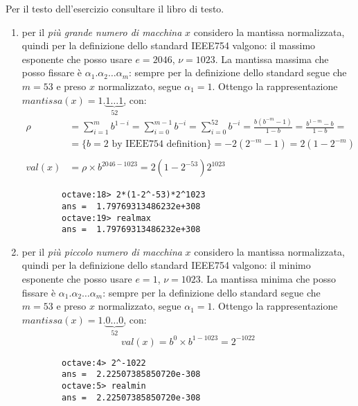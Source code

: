 \begin{exercise}[1.10]
Per il testo dell'esercizio consultare il libro di testo.
\end{exercise}
\begin{enumerate}
	\item per il \emph{pi\`u grande numero di macchina} $x$ considero la mantissa normalizzata,
	quindi per la definizione dello standard IEEE754 valgono: il massimo esponente che posso
	usare $e = 2046$, $\nu = 1023$.
	La mantissa massima che posso fissare \`e $\alpha_{1}.\alpha_{2} \ldots \alpha_{m}$:
	sempre per la definizione dello standard segue che $m = 53$ e preso $x$ normalizzato,
	segue $\alpha_{1} = 1$. Ottengo la rappresentazione 
		$mantissa(x) = 1.\underbrace{1 \ldots 1}_{52}$, con:
	\begin{displaymath}
	\begin{split}
		\rho &= \sum_{i = 1}^{m}{b^{1-i}} = \sum_{i = 0}^{m-1}{b^{-i}} = 
			\sum_{i = 0}^{52}{b^{-i}} = 
			\frac{b\left( b^{-m} - 1 \right)}{1 - b} = \frac{b^{1-m} - b}{1 - b} = \\
			&= \lbrace b = 2 \text{ by IEEE754 definition} \rbrace = -2(2^{-m}-1) = 
			2(1 - 2^{-m}) \\ \\
		val(x) &= \rho \times b^{2046-1023} = 2(1-2^{-53})2^{1023}
	\end{split}
	\end{displaymath}
	\begin{lstlisting}
		octave:18> 2*(1-2^-53)*2^1023
		ans =  1.79769313486232e+308
		octave:19> realmax
		ans =  1.79769313486232e+308
	\end{lstlisting}

	\item per il \emph{pi\`u piccolo numero di macchina} $x$ considero la mantissa normalizzata,
	quindi per la definizione dello standard IEEE754 valgono: il minimo esponente che posso
	usare $e = 1$, $\nu = 1023$.
	La mantissa minima che posso fissare \`e $\alpha_{1}.\alpha_{2} \ldots \alpha_{m}$:
	sempre per la definizione dello standard segue che $m = 53$ e preso $x$ normalizzato,
	segue $\alpha_{1} = 1$. Ottengo la rappresentazione 
		$mantissa(x) = 1.\underbrace{0 \ldots 0}_{52}$, con:
	\begin{displaymath}
		val(x) = b^{0} \times b^{1-1023} = 2^{-1022}
	\end{displaymath}
	\begin{lstlisting}
		octave:4> 2^-1022
		ans =  2.22507385850720e-308
		octave:5> realmin
		ans =  2.22507385850720e-308
	\end{lstlisting}


\end{enumerate}
